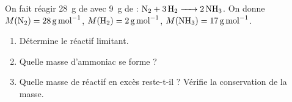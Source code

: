 \documentclass[11pt,a4paper]{article}
\begin{document}
\begin{exo}
On fait réagir \qty{28}{\gram} de  avec \qty{9}{\gram} de  : $\ce{N2 + 3 H2 -> 2 NH3}$.
On donne $M(\ce{N2})=\qty{28}{\gram\per\mole}$, $M(\ce{H2})=\qty{2}{\gram\per\mole}$,
$M(\ce{NH3})=\qty{17}{\gram\per\mole}$.
\begin{enumerate}[label=\alph*)]
  \item Détermine le réactif limitant.
  \item Quelle masse d'ammoniac se forme ?
  \item Quelle masse de réactif en excès reste-t-il ? Vérifie la conservation de la masse.
\end{enumerate}
\end{exo}
\end{document}
